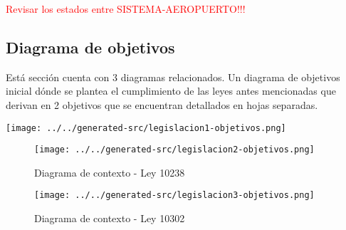 \textcolor{red}{Revisar los estados entre SISTEMA-AEROPUERTO!!!}

\subsection{Diagrama de objetivos}
Está sección cuenta con 3 diagramas relacionados. Un diagrama de objetivos inicial dónde se plantea el cumplimiento de las leyes antes mencionadas que derivan en 2 objetivos que se encuentran detallados en hojas separadas.

\texttt{[image: ../../generated-src/legislacion1-objetivos.png]}

\begin{figure}
\centering
\texttt{[image: ../../generated-src/legislacion2-objetivos.png]}
\caption{Diagrama de contexto - Ley 10238}
\end{figure}

\begin{figure}
\centering
\texttt{[image: ../../generated-src/legislacion3-objetivos.png]}
\caption{Diagrama de contexto - Ley 10302}
\end{figure}
